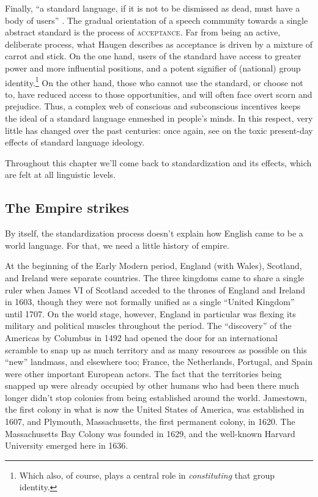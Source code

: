 \noindent Finally, ``a standard language, if it is not to be dismissed as dead, must have a body of users'' \citep[933]{Haugen1966}. The gradual orientation of a speech community towards a single abstract standard is the process of \textsc{acceptance}. Far from being an active, deliberate process, what Haugen describes as acceptance is driven by a mixture of carrot and stick. On the one hand, users of the standard have access to greater power and more influential positions, and a potent signifier of (national) group identity.\footnote{Which also, of course, plays a central role in \textit{constituting} that group identity.} On the other hand, those who cannot use the standard, or choose not to, have reduced access to those opportunities, and will often face overt scorn and prejudice. Thus, a complex web of conscious and subconscious incentives keeps the ideal of a standard language enmeshed in people's minds. In this respect, very little has changed over the past centuries: once again, see \citet{Lippi2012} on the toxic present-day effects of standard language ideology.

Throughout this chapter we'll come back to standardization and its effects, which are felt at all linguistic levels.

\subsection{The Empire strikes}\label{EModE-colonial}

By itself, the standardization process doesn't explain how English came to be a world language. For that, we need a little history of empire.

At the beginning of the Early Modern period, England (with Wales), Scotland, and Ireland were separate countries. The three kingdoms came to share a single ruler when James VI of Scotland acceded to the thrones of England and Ireland in 1603, though they were not formally unified as a single ``United Kingdom'' until 1707. On the world stage, however, England in particular was flexing its military and political muscles throughout the period. The ``discovery'' of the Americas by Columbus in 1492 had opened the door for an international scramble to snap up as much territory and as many resources as possible on this ``new'' landmass, and elsewhere too; France, the Netherlands, Portugal, and Spain were other important European actors. The fact that the territories being snapped up were already occupied by other humans who had been there much longer didn't stop colonies from being established around the world. Jamestown, the first colony in what is now the United States of America, was established in 1607, and Plymouth, Massachusetts, the first permanent colony, in 1620. The Massachusetts Bay Colony was founded in 1629, and the well-known Harvard University emerged here in 1636.

